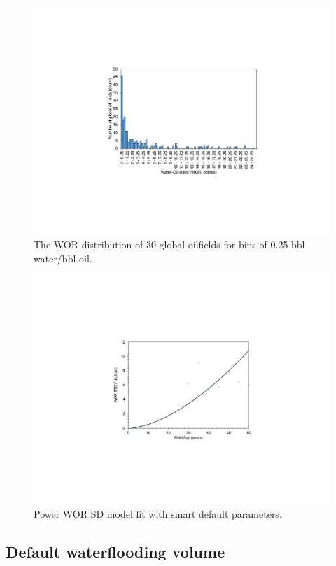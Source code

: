 \documentclass[11pt]{report}
\begin{document}
\begin{figure}
\includegraphics[width=1\columnwidth]{images/WOR_hist.pdf}
\caption{The WOR distribution of 30 global oilfields for bins of 0.25 bbl water/bbl oil.}
\label{fig:WOR_hist}
\end{figure}

\begin{figure}
\includegraphics[width=1\columnwidth]{images/WOR_STDV.pdf}
\caption{Power WOR SD model fit with smart default parameters. }
\label{fig:WOR_SD}
\end{figure}


\subsection{Default waterflooding volume}
\end{document}
